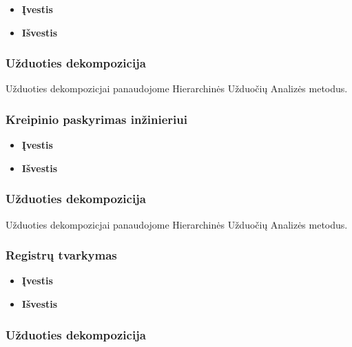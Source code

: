 		\begin{itemize}
			\item \textbf{Įvestis}
			\item \textbf{Išvestis} 
		\end{itemize}
		
	\subsubsection{Užduoties dekompozicija}

	Užduoties dekompozicjai panaudojome Hierarchinės Užduočių Analizės metodus.

	\subsubsection{Kreipinio paskyrimas inžinieriui}

		\begin{itemize}
			\item \textbf{Įvestis}
			\item \textbf{Išvestis} 
		\end{itemize}
		
	\subsubsection{Užduoties dekompozicija}

	Užduoties dekompozicjai panaudojome Hierarchinės Užduočių Analizės metodus.
	
	\subsubsection{Registrų tvarkymas}

		\begin{itemize}
			\item \textbf{Įvestis}
			\item \textbf{Išvestis} 
		\end{itemize}
		
	\subsubsection{Užduoties dekompozicija}

